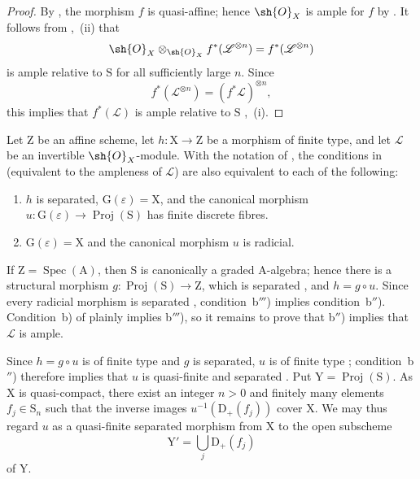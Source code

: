 \begin{proof}
By , the morphism $f$ is quasi-affine; hence $\sh{O}_X$ is ample for $f$ by . It follows from ,~(ii) that
\[
  \sh{O}_X\otimes_{\sh{O}_X}f^*(\mathscr{L}^{\otimes n})
  =f^*(\mathscr{L}^{\otimes n})
\]
is ample relative to $\mathrm{S}$ for all sufficiently large $n$. Since
\[
  f^*(\mathscr{L}^{\otimes n})=(f^*\mathscr{L})^{\otimes n},
\]
this implies that $f^*(\mathscr{L})$ is ample relative to $\mathrm{S}$ ,~(i).
\end{proof}

\begin{corollary}[18.12.17]
\label{IV.18.12.17}
Let $\mathrm{Z}$ be an affine scheme, let $h:\mathrm{X}\to\mathrm{Z}$ be a morphism of finite type, and let $\mathscr{L}$ be an invertible $\sh{O}_X$-module.
With the notation of , the conditions in  (equivalent to the ampleness of $\mathscr{L}$) are also equivalent to each of the following:

\begin{enumerate}
  \item[\rm b$''$)] $h$ is separated, $\mathrm{G}(\varepsilon)=\mathrm{X}$, and the canonical morphism $u:\mathrm{G}(\varepsilon)\to\operatorname{Proj}(\mathrm{S})$ has finite discrete fibres.
  \item[\rm b$'''$)] $\mathrm{G}(\varepsilon)=\mathrm{X}$ and the canonical morphism $u$ is radicial.
\end{enumerate}

If $\mathrm{Z}=\operatorname{Spec}(\mathrm{A})$, then $\mathrm{S}$ is canonically a graded $\mathrm{A}$-algebra; hence there is a structural morphism $g:\operatorname{Proj}(\mathrm{S})\to\mathrm{Z}$, which is separated , and $h=g\circ u$. Since every radicial morphism is separated , condition~b$'''$) implies condition~b$''$). Condition~b) of  plainly implies b$'''$), so it remains to prove that b$''$) implies that $\mathscr{L}$ is ample.

Since $h=g\circ u$ is of finite type and $g$ is separated, $u$ is of finite type ; condition~b$''$) therefore implies that $u$ is quasi-finite and separated . Put $\mathrm{Y}=\operatorname{Proj}(\mathrm{S})$. As $\mathrm{X}$ is quasi-compact, there exist an integer $n>0$ and finitely many elements $f_j\in\mathrm{S}_n$ such that the inverse images $u^{-1}(\mathrm{D}_+(f_j))$ cover $\mathrm{X}$. We may thus regard $u$ as a quasi-finite separated morphism from $\mathrm{X}$ to the open subscheme
\[
  \mathrm{Y}'=\bigcup_j\mathrm{D}_+(f_j)
\]
of $\mathrm{Y}$.


\end{corollary}
